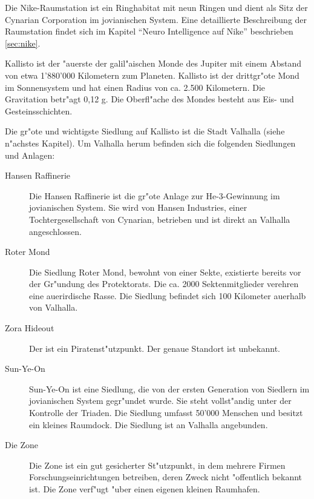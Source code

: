 Die Nike-Raumstation ist ein Ringhabitat mit neun Ringen und dient als Sitz der Cynarian Corporation im jovianischen System. Eine detaillierte Beschreibung der Raumstation findet sich im Kapitel ``Neuro Intelligence auf Nike'' beschrieben \cref{sec:nike}.

\clearpage\newpage



Kallisto ist der "au\3erste der galil"aischen Monde des Jupiter mit einem Abstand von etwa  1'880'000 Kilometern zum Planeten. Kallisto ist der drittgr"o\3te Mond im Sonnensystem und hat einen Radius von ca. 2.500 Kilometern. Die Gravitation betr"agt 0,12 g.  Die Oberfl"ache des Mondes besteht aus Eis- und Gesteinsschichten.

Die gr"o\3te und wichtigste Siedlung auf Kallisto ist die Stadt Valhalla (siehe n"achstes Kapitel). Um Valhalla herum befinden sich die folgenden Siedlungen und Anlagen:

\begin{description}
    \item[Hansen Raffinerie] Die Hansen Raffinerie ist die gr"o\3te Anlage zur He-3-Gewinnung im jovianischen System. Sie wird von Hansen 
        Industries, einer Tochtergesellschaft von Cynarian, betrieben und ist direkt an Valhalla angeschlossen.
    \item[Roter Mond] Die Siedlung Roter Mond, bewohnt von einer Sekte, existierte bereits vor der Gr"undung des Protektorats. Die ca. 2000 
        Sektenmitglieder verehren eine au\3erirdische Rasse. Die Siedlung befindet sich 100 Kilometer au\3erhalb von Valhalla.
    \item[Zora Hideout] Der ist ein Piratenst"utzpunkt. Der genaue Standort ist unbekannt.
    \item[Sun-Ye-On] Sun-Ye-On ist eine Siedlung, die von der ersten Generation von Siedlern im jovianischen System gegr"undet wurde. Sie 
        steht vollst"andig unter der Kontrolle der Triaden. Die Siedlung umfasst 50'000 Menschen und besitzt ein kleines Raumdock. Die Siedlung ist an Valhalla angebunden.
    \item[Die Zone] Die Zone ist ein gut gesicherter St"utzpunkt, in dem mehrere Firmen Forschungseinrichtungen betreiben, deren Zweck nicht 
        "offentlich bekannt ist. Die Zone verf"ugt "uber einen eigenen kleinen Raumhafen.
\end{description}


